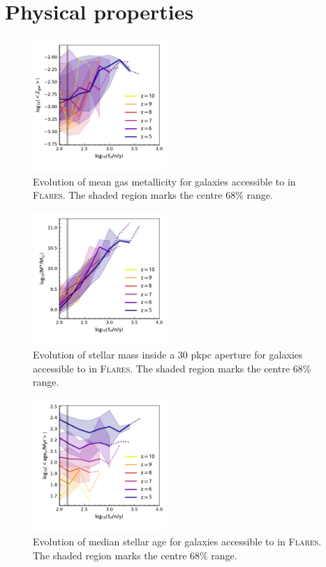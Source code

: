 
\section{Physical properties}

\begin{figure}
	\centering
	\includegraphics[width=0.45\textwidth]{figures/physical/zevo_G_Z.pdf}
	\caption{Evolution of mean gas metallicity for galaxies accessible to \euclid \: in \textsc{Flares}. The shaded region marks the centre 68\% range.}
	\label{fig:physical:gz_zevo}
\end{figure}

\begin{figure}
	\centering
	\includegraphics[width=0.45\textwidth]{figures/physical/zevo_Mstar_30.pdf}
	\caption{Evolution of stellar mass inside a 30 pkpc aperture for galaxies accessible to \euclid \: in \textsc{Flares}. The shaded region marks the centre 68\% range.}
	\label{fig:physical:mstar_zevo}
\end{figure}

\begin{figure}
	\centering
	\includegraphics[width=0.45\textwidth]{figures/physical/zevo_S_Age.pdf}
	\caption{Evolution of median stellar age for galaxies accessible to \euclid \: in \textsc{Flares}. The shaded region marks the centre 68\% range.}
	\label{fig:physical:age_zevo}
\end{figure}

